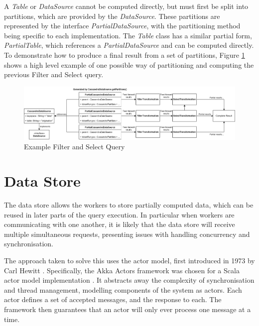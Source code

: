 A \textit{Table} or \textit{DataSource} cannot be computed directly, but must first be split into partitions, which are provided by the \textit{DataSource}. These partitions are represented by the interface \textit{PartialDataSource}, with the partitioning method being specific to each implementation. The \textit{Table} class has a similar partial form, \textit{PartialTable}, which references a \textit{PartialDataSource} and can be computed directly. To demonstrate how to produce a final result from a set of partitions, Figure \ref{fig:partial-filter-select-query} shows a high level example of one possible way of partitioning and computing the previous Filter and Select query.

\begin{figure}[htp]
	\centering
	\includegraphics[width=\textwidth]{chapters/diagrams/implementation/partial-filter-select-query}
	\caption{Example Filter and Select Query}
	\label{fig:partial-filter-select-query}
\end{figure}



\section{Data Store}
The data store allows the workers to store partially computed data, which can be reused in later parts of the query execution. In particular when workers are communicating with one another, it is likely that the data store will receive multiple simultaneous requests, presenting issues with handling concurrency and synchronisation.

The approach taken to solve this uses the actor model, first introduced in 1973 by Carl Hewitt \cite{hewitt1973session}. Specifically, the Akka Actors framework was chosen for a Scala actor model implementation \cite{akkaactors}. It abstracts away the complexity of synchronisation and thread management, modelling components of the system as actors. Each actor defines a set of accepted messages, and the response to each. The framework then guarantees that an actor will only ever process one message at a time.

